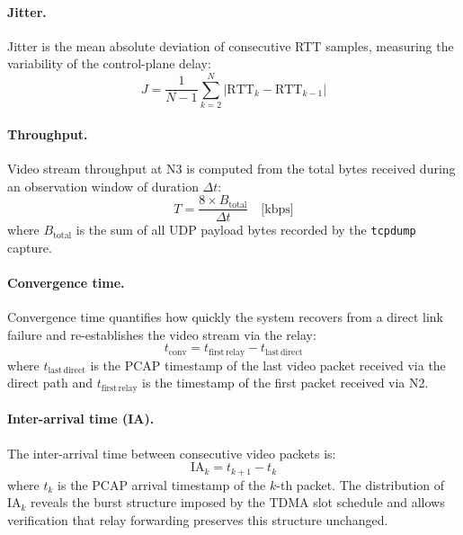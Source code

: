\paragraph{Jitter.}
Jitter is the mean absolute deviation of consecutive RTT samples, measuring
the variability of the control-plane delay:
\begin{equation}
J = \frac{1}{N-1}\sum_{k=2}^{N}\bigl|\mathrm{RTT}_k - \mathrm{RTT}_{k-1}\bigr|
\label{eq:jitter}
\end{equation}

\paragraph{Throughput.}
Video stream throughput at N3 is computed from the total bytes received
during an observation window of duration $\Delta t$:
\begin{equation}
T = \frac{8 \times B_{\mathrm{total}}}{\Delta t} \quad \text{[kbps]}
\label{eq:throughput}
\end{equation}
where $B_{\mathrm{total}}$ is the sum of all UDP payload bytes recorded
by the \texttt{tcpdump} capture.

\paragraph{Convergence time.}
Convergence time quantifies how quickly the system recovers from a direct
link failure and re-establishes the video stream via the relay:
\begin{equation}
t_{\mathrm{conv}} = t_{\mathrm{first\,relay}} - t_{\mathrm{last\,direct}}
\label{eq:convergence}
\end{equation}
where $t_{\mathrm{last\,direct}}$ is the PCAP timestamp of the last video
packet received via the direct path and $t_{\mathrm{first\,relay}}$ is the
timestamp of the first packet received via N2.

\paragraph{Inter-arrival time (IA).}
The inter-arrival time between consecutive video packets is:
\begin{equation}
\mathrm{IA}_k = t_{k+1} - t_k
\label{eq:ia}
\end{equation}
where $t_k$ is the PCAP arrival timestamp of the $k$-th packet. The
distribution of $\mathrm{IA}_k$ reveals the burst structure imposed by
the TDMA slot schedule and allows verification that relay forwarding
preserves this structure unchanged.


